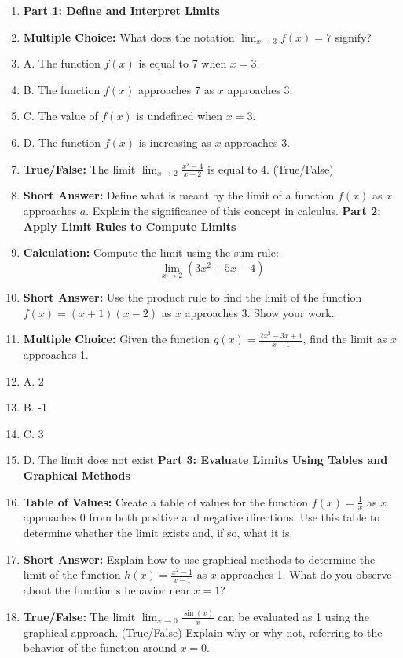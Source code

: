 \begin{enumerate}
    \item \textbf{Part 1: Define and Interpret Limits}
    \item \textbf{Multiple Choice:} What does the notation $\lim_{x \to 3} f(x) = 7$ signify?
    \item A. The function $f(x)$ is equal to 7 when $x = 3$.
    \item B. The function $f(x)$ approaches 7 as $x$ approaches 3.
    \item C. The value of $f(x)$ is undefined when $x = 3$.
    \item D. The function $f(x)$ is increasing as $x$ approaches 3.
    \item \textbf{True/False:} The limit $\lim_{x \to 2} \frac{x^2 - 4}{x - 2}$ is equal to 4. (True/False)
    \item \textbf{Short Answer:} Define what is meant by the limit of a function $f(x)$ as $x$ approaches $a$. Explain the significance of this concept in calculus. \textbf{Part 2: Apply Limit Rules to Compute Limits}
    \item \textbf{Calculation:} Compute the limit using the sum rule: $$ \lim_{x \to 2} (3x^2 + 5x - 4) $$
    \item \textbf{Short Answer:} Use the product rule to find the limit of the function $f(x) = (x + 1)(x - 2)$ as $x$ approaches 3. Show your work.
    \item \textbf{Multiple Choice:} Given the function $g(x) = \frac{2x^2 - 3x + 1}{x - 1}$, find the limit as $x$ approaches 1.
    \item A. 2
    \item B. -1
    \item C. 3
    \item D. The limit does not exist \textbf{Part 3: Evaluate Limits Using Tables and Graphical Methods}
    \item \textbf{Table of Values:} Create a table of values for the function $f(x) = \frac{1}{x}$ as $x$ approaches 0 from both positive and negative directions. Use this table to determine whether the limit exists and, if so, what it is.
    \item \textbf{Short Answer:} Explain how to use graphical methods to determine the limit of the function $h(x) = \frac{x^2 - 1}{x - 1}$ as $x$ approaches 1. What do you observe about the function’s behavior near $x = 1$?
    \item \textbf{True/False:} The limit $\lim_{x \to 0} \frac{\sin(x)}{x}$ can be evaluated as 1 using the graphical approach. (True/False) Explain why or why not, referring to the behavior of the function around $x = 0$.
\end{enumerate}

